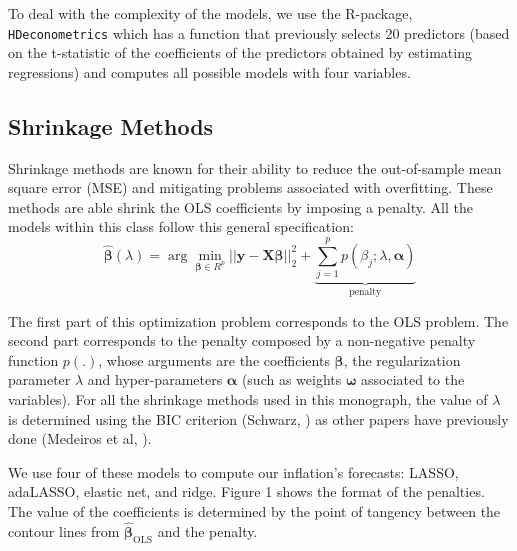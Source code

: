 \documentclass[12pt,openright,twoside,a4paper,brazil,english,emptypage,openany]{abntex2}
\begin{document}
To deal with the complexity of the models, we use the \textsf{R}-package, \texttt{HDeconometrics} which has a function that previously selects 20 predictors (based on the t-statistic of the coefficients of the predictors obtained by estimating regressions) and computes all possible models with four variables.

\subsection{Shrinkage Methods}

\hspace{1em} Shrinkage methods are known for their ability to reduce the out-of-sample mean square error (MSE) and mitigating problems associated with overfitting.  These methods are able shrink the OLS coefficients by imposing a penalty. All the models within this class follow this general specification:
\begin{equation*}
    \bm{\hat{\beta}}(\lambda) = \arg \min_{\bm{\beta} \in R^p}  ||\bm{y}-\bm{X \beta}||_2^2 + \underbrace{\sum_{j=1}^p p(\beta_j; \lambda, \bm{\alpha})}_{\text{penalty}}
\end{equation*}  

The first part of this optimization problem corresponds to the OLS problem. The second part corresponds to the penalty composed by a non-negative penalty function $p(.)$, whose arguments are the coefficients $\bm{\beta}$, the regularization parameter $\lambda$ and hyper-parameters $\bm{\alpha}$ (such as weights $\bm{\omega}$ associated to the variables). For all the shrinkage methods used in this monograph, the value of $\lambda$ is determined using the BIC criterion (Schwarz, \citeyear{bic}) as other papers have previously done (Medeiros et al, \citeyear{datarich}).

We use four of these models to compute our inflation's forecasts: LASSO, adaLASSO, elastic net, and ridge. Figure 1 shows the format of the penalties. The value of the coefficients is determined by the point of tangency between the contour lines from $\hat{\bm{\beta}}_{\text{OLS}}$ and the penalty. 
\end{document}
